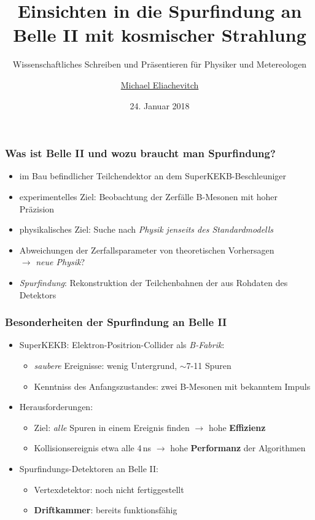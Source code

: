 \documentclass[18pt]{beamer}
\title{Einsichten in die Spurfindung an Belle II mit kosmischer Strahlung}
\subtitle{Wissenschaftliches Schreiben und Präsentieren für Physiker und Metereologen}
\author{\underline{Michael Eliachevitch}}
\date{24. Januar 2018}
\institute{}
\begin{document}

\begin{frame}
  \titlepage
\end{frame}

\begin{frame}
  \frametitle{Was ist Belle II und wozu braucht man Spurfindung?}
  \begin{itemize}
    \item im Bau befindlicher Teilchendektor an dem SuperKEKB-Beschleuniger
    \item experimentelles Ziel: Beobachtung der Zerfälle B-Mesonen mit hoher Präzision
    \item physikalisches Ziel: Suche nach \emph{Physik jenseits des Standardmodells}
    \item Abweichungen der Zerfallsparameter von theoretischen Vorhersagen\\$\rightarrow$ \emph{neue Physik}?
    \item \emph{Spurfindung}: Rekonstruktion der Teilchenbahnen der aus Rohdaten des Detektors
    \end{itemize}
  \end{frame}

  

\begin{frame}
  \frametitle{Besonderheiten der Spurfindung an Belle II}
  \begin{itemize}
  \item SuperKEKB: Elektron-Positrion-Collider als \emph{B-Fabrik}\cite{Bevan:2014iga}:
    \begin{itemize}
    \item \emph{saubere} Ereignisse: wenig Untergrund, $\sim$7-11 Spuren 
    \item Kenntniss des Anfangszustandes: zwei B-Mesonen mit bekanntem Impuls
    \end{itemize}
  \end{itemize}
    \begin{itemize}
    \item Herausforderungen:
      \begin{itemize}
      \item Ziel: \emph{alle} Spuren in einem Ereignis finden $\rightarrow$ hohe \textbf{Effizienz}
      \item Kollisionsereignis etwa alle 4\,ns  \cite{Abe:2010gxa}
 $\rightarrow$ hohe \textbf{Performanz} der Algorithmen
      \end{itemize}
    \item Spurfindungs-Detektoren an Belle II:
      \begin{itemize}
      \item Vertexdetektor: noch nicht fertiggestellt
      \item \textbf{Driftkammer}: bereits funktionsfähig
      \end{itemize}
  \end{itemize}
  
\end{frame}
\end{document}
